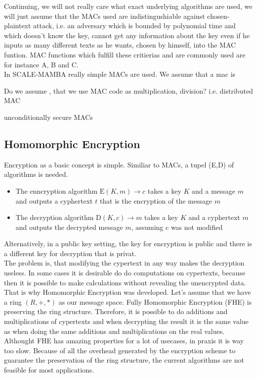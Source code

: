 \documentclass[english,runningheads,a4paper]{llncs}[2018/03/10]
\begin{document}
Continuing, we will not really care what exact underlying algorithms are used, we will just assume that the MACs used are indistingushiable against chosen-plaintext attack, i.e. an adversary which is bounded by polynomial time and which doesn't know the key, cannot get any information about the key even if he inputs as many different texts as he wants, chosen by himself,  into the MAC funtion. MAC functions which fulfill these critierias and are commonly used are for instance A, B and C.\\


In SCALE-MAMBA really simple MACs are used. We assume that a mac is 

Do we assume , that we use MAC code as multiplication, division? i.e. distributed MAC 

unconditionally  secure  MACs 


\subsection{Homomorphic Encryption}
Encryption as a basic concept is simple. Similiar to MACs, a tupel (E,D) of algorithms is needed.\\
\begin{itemize}
\item The enncryption algorithm \(\text{E}(K,m)\rightarrow c\) takes a key \(K\) and a message \(m\) and outputs a cyphertext \(t\) that is the encryption of the message \(m\)\\
\item The decryption algorithm \(\text{D}(K,c)\rightarrow m\) takes a key \(K\) and a cyphertext \(m\) and outputs the decrypted message \(m\), assuming c was not modified\\
\end{itemize}
Alternatively, in a public key setting, the key for encryption is public and there is a different key for decryption that is privat.\\
The problem is, that modifying the cypertext in any way makes the decryption useless. In some cases it is desirable do do computations on cypertexts, because then it is possible to make calculations without revealing the unencrypted data. That is why Homomorphic Encryption was developed. Let's assume that we have a ring \((R,+,*)\) as our message space. Fully Homomorphic Encryption (FHE) is preserving the ring structure. Therefore, it is possible to do additions and multiplications of cypertexts and when decrypting the result it is the same value as when doing the same additions and multiplications on the real values.\\
Althought FHE has amazing properties for a lot of usecases, in praxis it is way too slow. Because of all the overhead generated by the encryption scheme to guarantee the preservation of the ring structure, the current algorithms are not feasible for most applications.
\end{document}
